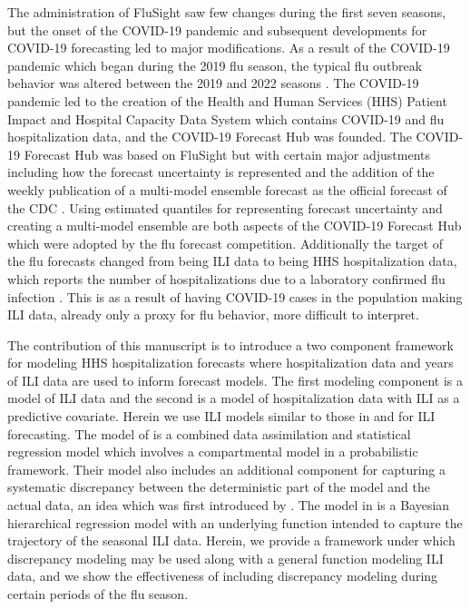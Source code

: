 \documentclass[ba]{imsart}
\theoremstyle{plain}
\theoremstyle{definition}
\theoremstyle{remark}
\begin{document}
The administration of FluSight saw few changes during the first seven seasons, but the onset of the COVID-19 pandemic and subsequent developments for COVID-19 forecasting led to major modifications. As a result of the COVID-19 pandemic which began during the 2019 flu season, the typical flu outbreak behavior was altered between the 2019 and 2022 seasons \cite[]{mathis2024evaluation}. The COVID-19 pandemic led to the creation of the Health and Human Services (HHS) Patient Impact and Hospital Capacity Data System \cite[]{healthdata2024covidts} which contains COVID-19 and flu hospitalization data, and the COVID-19 Forecast Hub was founded. The COVID-19 Forecast Hub was based on FluSight but with certain major adjustments including how the forecast uncertainty is represented and the addition of the weekly publication of a multi-model ensemble forecast as the official forecast of the CDC \cite[]{bracher2021evaluating, Cramer2022-hub-dataset}. Using estimated quantiles for representing forecast uncertainty and creating a multi-model ensemble are both aspects of the COVID-19 Forecast Hub which were adopted by the flu forecast competition. Additionally the target of the flu forecasts changed from being ILI data to being HHS hospitalization data, which reports the number of hospitalizations due to a laboratory confirmed flu infection  \cite[]{mathis2024evaluation,healthdata2024covidts}. This is as a result of having COVID-19 cases in the population making ILI data, already only a proxy for flu behavior, more difficult to interpret.



The contribution of this manuscript is to introduce a two component framework for modeling HHS hospitalization forecasts where hospitalization data and years of ILI data are used to inform forecast models. The first modeling component is a model of ILI data and the second is a model of hospitalization data with ILI as a predictive covariate.
Herein we use ILI models similar to those in \cite{osthus2019dynamic} and \cite{ulloa2019} for ILI forecasting.
The model of \cite{osthus2019dynamic} is a combined data assimilation and statistical regression model which involves a compartmental model in a probabilistic framework. Their model also includes an additional component for capturing a systematic discrepancy between the deterministic part of the model and the actual data, an idea which was first introduced by \cite{kennedy2001bayesian}. The model in \cite{ulloa2019} is a Bayesian hierarchical regression model with an underlying function intended to capture the trajectory of the seasonal ILI data. Herein, we provide a framework under which discrepancy modeling may be used along with a general function modeling ILI data, and we show the effectiveness of including discrepancy modeling during certain periods of the flu season. 
\end{document}
